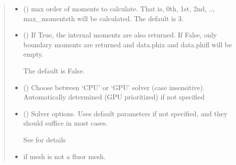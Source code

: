 \documentclass[letterpaper,10pt,english]{sphinxmanual}
\begin{document}
\begin{fulllineitems}
\begin{quote}
\begin{description}
\begin{itemize}
\item {} 
\sphinxAtStartPar
{} (\sphinxstyleliteralemphasis{\sphinxupquote{, }}) \textendash{} max order of moments to calculate. That is, 0th, 1st, 2nd, .., max\_moments\sphinxhyphen{}th will be calculated. The default is 3.

\item {} 
\sphinxAtStartPar
{} (\sphinxstyleliteralemphasis{\sphinxupquote{, }}) \textendash{} 
\sphinxAtStartPar
If True, the internal moments are also returned. If False, only boundary moments are returned and data.phix and data.phifl will be empty.

\sphinxAtStartPar
The default is False.


\item {} 
\sphinxAtStartPar
{} (\sphinxstyleliteralemphasis{\sphinxupquote{, }}) \textendash{} Choose between ‘CPU’ or ‘GPU’ solver (case insensitive). Automatically determined (GPU prioritized) if not specified

\item {} 
\sphinxAtStartPar
{} ({\hyperref[\detokenize{_autosummary/nirfasterff.utils.SolverOptions:nirfasterff.utils.SolverOptions}]{}}\sphinxstyleliteralemphasis{\sphinxupquote{, }}) \textendash{} 
\sphinxAtStartPar
Solver options. Uses default parameters if not specified, and they should suffice in most cases.

\sphinxAtStartPar
See {\hyperref[\detokenize{_autosummary/nirfasterff.utils.SolverOptions:nirfasterff.utils.SolverOptions}]{}} for details


\end{itemize}

\begin{itemize}
\item {} 
\sphinxAtStartPar
{} \textendash{} if mesh is not a fluor mesh.


\end{itemize}
\end{description}
\end{quote}
\end{fulllineitems}
\end{document}
